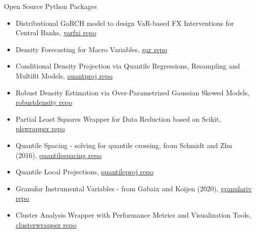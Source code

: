 \documentclass[usegeometry, 10pt, a4paper]{cv} %
\begin{document}
\begin{rubriquetableau}[0.95\textwidth]{Open Source Python Packages}\\
  \vspace{-0.8cm}
  
\begin{itemize}
\item Distributional GaRCH model to design VaR-based FX Interventions for Central Banks, \href{https://github.com/romainlafarguette/varfxi}{varfxi repo} 
\item Density Forecasting for Macro Variables, \href{https://github.com/IMFGAR/GaR}{gar repo}
\item Conditional Density Projection via Quantile Regressions, Resampling and Multifit Models, \href{https://github.com/romainlafarguette/gar}{quantproj repo}
\item Robust Density Estimation via Over-Parametrized Gaussian Skewed Models, \href{https://github.com/romainlafarguette/robustdensity}{robustdensity repo}
\item Partial Least Squares Wrapper for Data Reduction based on Scikit, \href{https://github.com/romainlafarguette/plswrapper}{plswrapper repo}
\item Quantile Spacing - solving for quantile crossing, from Schmidt and Zhu (2016), \href{https://github.com/romainlafarguette/quantilespacing}{quantilespacing repo}
\item Quantile Local Projections, \href{https://github.com/romainlafarguette/quantileproj}{quantileproj repo}
\item Granular Instrumental Variables - from Gabaix and Koijen (2020), \href{https://github.com/romainlafarguette/granulariv}{granulariv repo}
\item Cluster Analysis Wrapper with Performance Metrics and Visualization Tools, \href{https://github.com/romainlafarguette/clusterwrapper}{clusterwrapper repo}
\end{itemize}  

\end{rubriquetableau}

\end{document}

